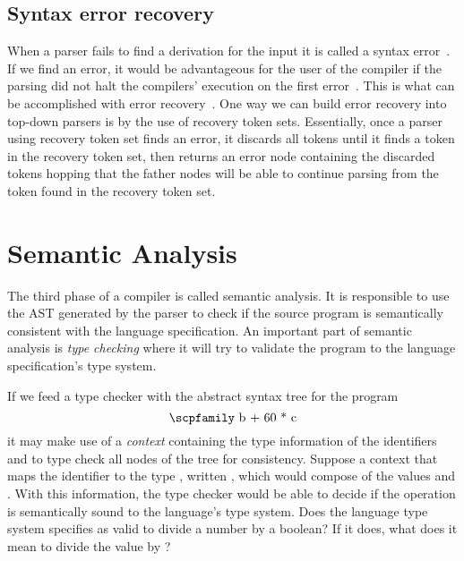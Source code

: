 \documentclass[
  oneside,
  english,
  coorientadorbanca,
  noabntexcite
]{ufsc-thesis-rn46-2019}
\newcommand{\codett}[1]{\text{\scpfamily#1}}
\newcommand{\code}[1]{\text{\scpfamily\setlength\spaceskip{0.35em}#1}}
\newcommand{\typer}[2]{\code{#1 \codett{:} #2}}
\begin{document}
\subsection{Syntax error recovery}

When a parser fails to find a derivation for the input it is called a syntax error~\cite{appel2003modern}.
If we find an error, it would be advantageous for the user of the compiler if the parsing did not halt the compilers' execution on the first error~\cite{appel2003modern}.
This is what can be accomplished with error recovery~\cite{appel2003modern}.
One way we can build error recovery into top-down parsers is by the use of recovery token sets.
Essentially, once a parser using recovery token set finds an error, it discards all tokens until it finds a token in the recovery token set, then returns an error node containing the discarded tokens hopping that the father nodes will be able to continue parsing from the token found in the recovery token set.

\section{Semantic Analysis}\label{chapter:background:sec:semantic}

The third phase of a compiler is called semantic analysis.
It is responsible to use the AST generated by the parser to check if the source program is semantically consistent with the language specification.
An important part of semantic analysis is \textit{type checking} where it will try to validate the program to the language specification's type system.

If we feed a type checker with the abstract syntax tree for the program
\begin{equation*}
  \codett{b + 60 * c}
\end{equation*}
it may make use of a \textit{context} containing the type information of the identifiers \codett{b} and \codett{c} to type check all nodes of the tree for consistency.
Suppose a context that maps the identifier \codett{c} to the type \codett{Bool}, written \typer{c}{Bool}, which would compose of the values \codett{true} and \codett{false}.
With this information, the type checker would be able to decide if the operation \codett{60 / c} is semantically sound to the language's type system.
Does the language type system specifies as valid to divide a number by a boolean?
If it does, what does it mean to divide the value \codett{60} by \codett{false}?
\end{document}
